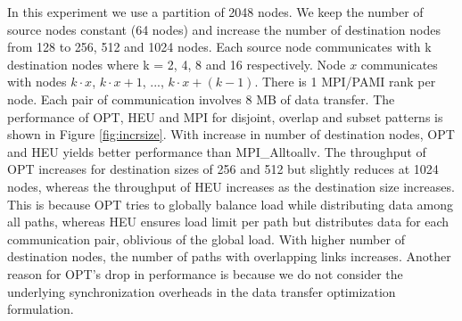 In this experiment we use a partition of 2048 nodes. We keep the number of source nodes constant (64 nodes) and increase the number of destination nodes from 128 to 256, 512 and 1024 nodes. Each source node communicates with k destination nodes where k = 2, 4, 8 and 16 respectively. Node $x$ communicates with nodes $k\cdot x$, $k\cdot x+1$, ..., $k\cdot x+(k-1)$. There is 1 MPI/PAMI rank per node. Each pair of communication involves 8 MB of data transfer. The performance of OPT, HEU and MPI for disjoint, overlap and subset patterns is shown in Figure \ref{fig:incrsize}. With increase in number of destination nodes, OPT and HEU yields better performance than MPI\_Alltoallv. The throughput of OPT increases for destination sizes of 256 and 512 but slightly reduces at 1024 nodes, whereas the throughput of HEU increases as the destination size increases. This is because OPT tries to globally balance load while distributing data among all paths, whereas HEU ensures load limit per path but distributes data for each communication pair, oblivious of the global load. With higher number of destination nodes, the number of paths with overlapping links increases. Another reason for OPT's drop in performance is because we do not consider the underlying synchronization overheads in the data transfer optimization formulation.  
